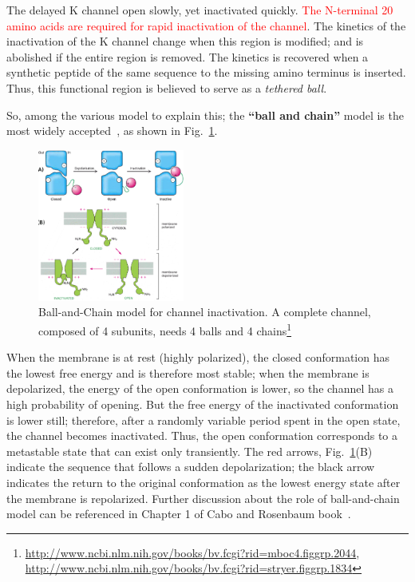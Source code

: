\begin{mdframed}
  The delayed K channel open slowly, yet inactivated quickly.
  \textcolor{red}{The N-terminal 20 amino acids are required for rapid
    inactivation of the channel}.
  The kinetics of the inactivation of the K channel change when this
  region is modified; and is abolished if the entire region is
  removed. The kinetics is recovered when a synthetic peptide of the
  same sequence to the missing amino terminus is inserted. Thus, this
  functional region is believed to serve as a {\it tethered ball}.

  So, among the various model to explain this; the
  {\bf ``ball and chain''} model is the most widely
  accepted~\citep{armstrong1973crm}, as shown in
  Fig.~\ref{fig:ball_chain}.

\end{mdframed}



\begin{figure}[hbt]
  \centerline{\includegraphics[height=5cm, angle=0]{./images/ball_chain_model.eps}}
  \caption{Ball-and-Chain model for channel inactivation. A complete
    channel, composed of 4 subunits, needs 4 balls and 4 chains\footnote{\url{http://www.ncbi.nlm.nih.gov/books/bv.fcgi?rid=mboc4.figgrp.2044},
      \url{http://www.ncbi.nlm.nih.gov/books/bv.fcgi?rid=stryer.figgrp.1834}}}
  \label{fig:ball_chain}
\end{figure}


When the membrane is at rest (highly polarized), the closed
conformation has the lowest free energy and is therefore most stable;
when the membrane is depolarized, the energy of the open conformation
is lower, so the channel has a high probability of opening. But the
free energy of the inactivated conformation is lower still; therefore,
after a randomly variable period spent in the open state, the channel
becomes inactivated. Thus, the open conformation corresponds to a
metastable state that can exist only transiently. The red arrows,
Fig.~\ref{fig:ball_chain}(B) indicate the sequence that follows a sudden
depolarization; the black arrow indicates the return to the original
conformation as the lowest energy state after the membrane is
repolarized. Further discussion about the role of ball-and-chain model
can be referenced in Chapter 1 of Cabo and Rosenbaum book~\citep{cabo2002rosenbaum}.


